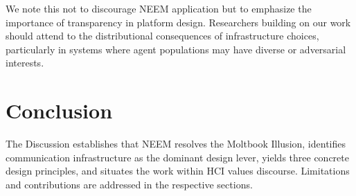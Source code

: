 We note this not to discourage NEEM application but to emphasize the importance of transparency in platform design. Researchers building on our work should attend to the distributional consequences of infrastructure choices, particularly in systems where agent populations may have diverse or adversarial interests.

\section{Conclusion}
\label{sec:discussion-conclusion}

The Discussion establishes that NEEM resolves the Moltbook Illusion, identifies communication infrastructure as the dominant design lever, yields three concrete design principles, and situates the work within HCI values discourse. Limitations and contributions are addressed in the respective sections.

